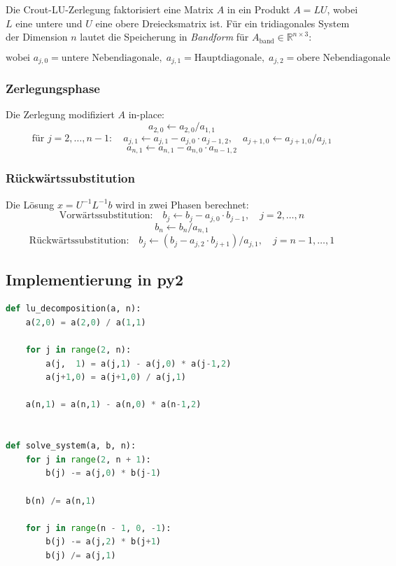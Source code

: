 ﻿\documentclass[a4paper,12pt]{article}
\theoremstyle{definition}
\begin{document}
Die Crout-LU-Zerlegung faktorisiert eine Matrix $A$ in ein Produkt $A = LU$, wobei
$L$ eine untere und $U$ eine obere Dreiecksmatrix ist. F\"ur ein tridiagonales System
der Dimension $n$ lautet die Speicherung in \emph{Bandform} für $A_{\text{band}} \in \mathbb{R}^{n \times 3}$:

\[
	\text{wobei } a_{j,0} = \text{untere Nebendiagonale},\;
	a_{j,1} = \text{Hauptdiagonale},\;
	a_{j,2} = \text{obere Nebendiagonale}
\]

\subsubsection{Zerlegungsphase}

Die Zerlegung modifiziert $A$ in-place:
\[
	a_{2,0} \leftarrow a_{2,0} / a_{1,1}
\]
\[
	\text{f\"ur } j = 2, \ldots, n-1: \quad
	a_{j,1} \leftarrow a_{j,1} - a_{j,0} \cdot a_{j-1,2}, \quad
	a_{j+1,0} \leftarrow a_{j+1,0} / a_{j,1}
\]
\[
	a_{n,1} \leftarrow a_{n,1} - a_{n,0} \cdot a_{n-1,2}
\]

\subsubsection{R\"uckw\"artssubstitution}

Die L\"osung $x = U^{-1} L^{-1} b$ wird in zwei Phasen berechnet:
\[
	\text{Vorw\"artssubstitution:} \quad
	b_j \leftarrow b_j - a_{j,0} \cdot b_{j-1}, \quad j = 2, \ldots, n
\]
\[
	b_n \leftarrow b_n / a_{n,1}
\]
\[
	\text{R\"uckw\"artssubstitution:} \quad
	b_j \leftarrow (b_j - a_{j,2} \cdot b_{j+1}) / a_{j,1}, \quad j = n-1, \ldots, 1
\]

\subsection{Implementierung in py2}

\begin{lstlisting}[language=Python, caption={Vollst\"andige Crout-Implementierung in py2-Syntax}]
def lu_decomposition(a, n):
    a(2,0) = a(2,0) / a(1,1)

    for j in range(2, n):
        a(j,  1) = a(j,1) - a(j,0) * a(j-1,2)
        a(j+1,0) = a(j+1,0) / a(j,1)

    a(n,1) = a(n,1) - a(n,0) * a(n-1,2)


def solve_system(a, b, n):
    for j in range(2, n + 1):
        b(j) -= a(j,0) * b(j-1)

    b(n) /= a(n,1)

    for j in range(n - 1, 0, -1):
        b(j) -= a(j,2) * b(j+1)
        b(j) /= a(j,1)
\end{lstlisting}
\end{document}
